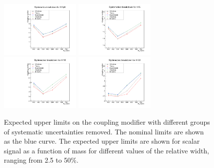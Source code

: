 \begin{figure}[!Hhtb]
\centering
\includegraphics[width=0.35\textwidth,keepaspectratio=true]{fig/app5/breakdowns/generic_breakdown_H_2p5.pdf}
\includegraphics[width=0.35\textwidth,keepaspectratio=true]{fig/app5/breakdowns/generic_breakdown_H_5.pdf}
\includegraphics[width=0.35\textwidth,keepaspectratio=true]{fig/app5/breakdowns/generic_breakdown_H_10.pdf}
\includegraphics[width=0.35\textwidth,keepaspectratio=true]{fig/app5/breakdowns/generic_breakdown_H_50.pdf}
\caption{Expected upper limits on the coupling modifier with different groups of systematic uncertainties removed. The nominal limits are shown as the blue curve. The expected upper limits are shown for scalar signal as a function of mass for different values of the relative width, ranging from 2.5 to 50\%.}
\label{fig:breakdown_hwidths}
\end{figure}

